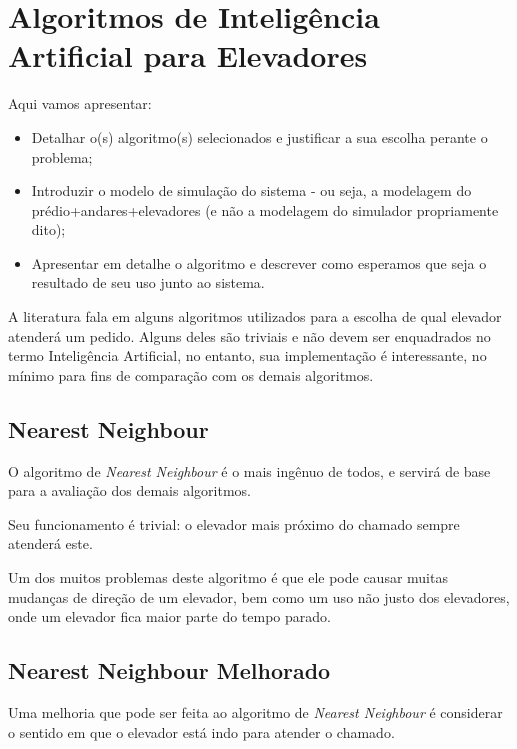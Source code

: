 \chapter{\label{chap:ai}Algoritmos de Inteligência Artificial para Elevadores}

Aqui vamos apresentar:

\begin{itemize}
\item Detalhar o(s) algoritmo(s) selecionados e justificar a sua escolha perante o problema;
\item Introduzir o modelo de simulação do sistema - ou seja, a modelagem do
prédio+andares+elevadores (e não a modelagem do simulador propriamente dito);
\item Apresentar em detalhe o algoritmo e descrever como esperamos que seja o resultado de seu uso junto ao sistema.
\end{itemize}

A literatura fala em alguns algoritmos utilizados para a escolha de qual
elevador atenderá um pedido. Alguns deles são triviais e não devem ser
enquadrados no termo Inteligência Artificial, no entanto, sua implementação é
interessante, no mínimo para fins de comparação com os demais algoritmos.

\section{\label{sec:ai:nn}Nearest Neighbour}

O algoritmo de \textit{Nearest Neighbour} é o mais ingênuo de todos, e servirá
de base para a avaliação dos demais algoritmos.

Seu funcionamento é trivial: o elevador mais próximo do chamado sempre
atenderá este.

Um dos muitos problemas deste algoritmo é que ele pode causar muitas mudanças de
direção de um elevador, bem como um uso não justo dos elevadores, onde um
elevador fica maior parte do tempo parado.


\section{\label{sec:ai:nnm}Nearest Neighbour Melhorado}

Uma melhoria que pode ser feita ao algoritmo de \textit{Nearest Neighbour}
é considerar o sentido em que o elevador está indo para atender o chamado.

